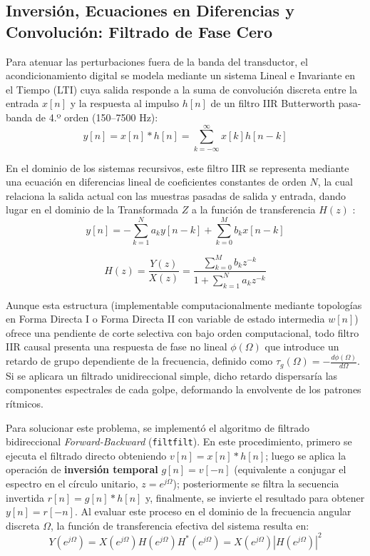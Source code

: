 \documentclass[journal, a4paper]{IEEEtran}
\begin{document}
\subsection{Inversión, Ecuaciones en Diferencias y Convolución: Filtrado de Fase Cero}
Para atenuar las perturbaciones fuera de la banda del transductor, el acondicionamiento digital se modela mediante un sistema Lineal e Invariante en el Tiempo (LTI) cuya salida responde a la suma de convolución discreta entre la entrada $x[n]$ y la respuesta al impulso $h[n]$ de un filtro IIR Butterworth pasa-banda de 4.º orden (150--7500 Hz):
\begin{equation}
    y[n] = x[n] * h[n] = \sum_{k=-\infty}^{\infty} x[k] h[n - k]
\end{equation}

En el dominio de los sistemas recursivos, este filtro IIR se representa mediante una ecuación en diferencias lineal de coeficientes constantes de orden $N$, la cual relaciona la salida actual con las muestras pasadas de salida y entrada, dando lugar en el dominio de la Transformada $Z$ a la función de transferencia $H(z)$ \cite{Proakis}:
\begin{equation}
    y[n] = -\sum_{k=1}^{N} a_k y[n - k] + \sum_{k=0}^{M} b_k x[n - k] 
\end{equation}


\begin{equation}
    H(z) = \frac{Y(z)}{X(z)} = \frac{\sum_{k=0}^{M} b_k z^{-k}}{1 + \sum_{k=1}^{N} a_k z^{-k}}
\end{equation}




Aunque esta estructura (implementable computacionalmente mediante topologías en Forma Directa I o Forma Directa II con variable de estado intermedia $w[n]$) ofrece una pendiente de corte selectiva con bajo orden computacional, todo filtro IIR causal presenta una respuesta de fase no lineal $\phi(\Omega)$ que introduce un retardo de grupo dependiente de la frecuencia, definido como $\tau_g(\Omega) = -\frac{d\phi(\Omega)}{d\Omega}$. Si se aplicara un filtrado unidireccional simple, dicho retardo dispersaría las componentes espectrales de cada golpe, deformando la envolvente de los patrones rítmicos.

Para solucionar este problema, se implementó el algoritmo de filtrado bidireccional \textit{Forward-Backward} (\texttt{filtfilt}). En este procedimiento, primero se ejecuta el filtrado directo obteniendo $v[n] = x[n] * h[n]$; luego se aplica la operación de \textbf{inversión temporal} $g[n] = v[-n]$ (equivalente a conjugar el espectro en el círculo unitario, $z = e^{j\Omega}$); posteriormente se filtra la secuencia invertida $r[n] = g[n] * h[n]$ y, finalmente, se invierte el resultado para obtener $y[n] = r[-n]$. Al evaluar este proceso en el dominio de la frecuencia angular discreta $\Omega$, la función de transferencia efectiva del sistema resulta en:
\begin{equation}
    Y(e^{j\Omega}) = X(e^{j\Omega}) H(e^{j\Omega}) H^*(e^{j\Omega}) = X(e^{j\Omega}) |H(e^{j\Omega})|^2
\end{equation}
\end{document}
